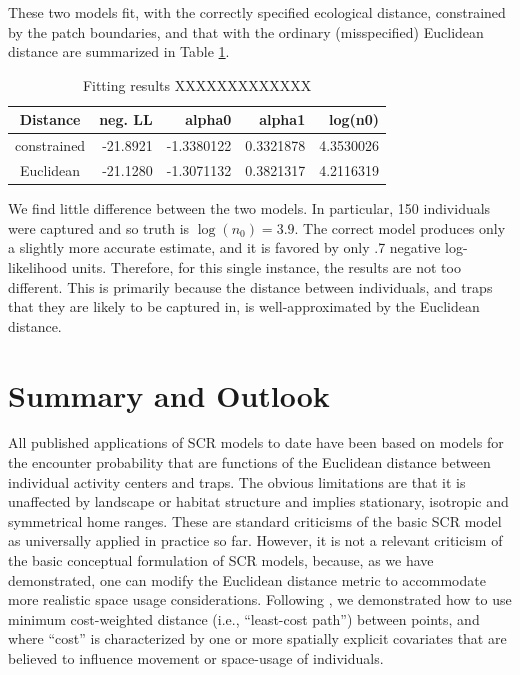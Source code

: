 These two models fit, with the correctly specified ecological
distance, constrained by the patch boundaries, and that with the
ordinary (misspecified) Euclidean distance are summarized in Table \ref{rsf.tab.fakecorridor}.
\begin{table}
\centering
\caption{Fitting results XXXXXXXXXXXXX}
\begin{tabular}{crrrr}
Distance    &  neg. LL &    alpha0   & alpha1    &log(n0) \\ \hline
constrained & -21.8921 &  -1.3380122 & 0.3321878 & 4.3530026 \\
Euclidean   & -21.1280 &  -1.3071132 & 0.3821317 & 4.2116319 \\
\end{tabular}
\label{rsf.tab.fakecorridor}
\end{table}
We find little difference between the two models. In
particular, 150 individuals were captured and so truth is $\log(n_{0}) = 3.9$.
The correct model produces only a slightly more accurate  estimate, and
it is favored by only .7 negative log-likelihood units.
Therefore, for this single instance, the results are not too different.
This is primarily because 
 the distance between individuals, and traps that they are likely
to be captured in, is well-approximated by the Euclidean distance.




\section{Summary and Outlook}


All published applications of SCR models to date have been based on
models for the encounter probability that are functions of the
Euclidean distance between individual activity centers and traps. The
obvious limitations are that it is unaffected by landscape or habitat
structure and implies stationary, isotropic and symmetrical home
ranges. These are standard criticisms of the basic SCR model as
universally applied in practice so far. However, it is not a relevant
criticism of the basic conceptual formulation of SCR models, because,
as we have demonstrated, one can modify the Euclidean distance metric
to accommodate more realistic space usage considerations.  Following
\citet{royle_etal:2012ecol}, we demonstrated how to use minimum
cost-weighted distance (i.e., ``least-cost path'') between points, and
where ``cost'' is characterized by one or more spatially explicit
covariates that are believed to influence movement or space-usage of
individuals.

